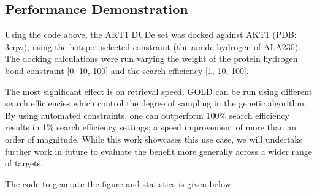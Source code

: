 \documentclass[letterpaper,10pt,english]{sphinxmanual}
\begin{document}
\begin{sphinxVerbatim}[commandchars=\\\{\}]
 

      
       
      
      
      

\end{sphinxVerbatim}


\subsection{Performance Demonstration}
\label{\detokenize{tutorial:performance-demonstration}}
Using the code above, the AKT1 DUD\sphinxhyphen{}e set was docked against AKT1 (PDB: 3cqw), using the hotspot selected constraint
(the amide hydrogen of ALA230). The docking calculations were run varying the weight of the protein hydrogen bond
constraint {[}0, 10, 100{]} and the search efficiency {[}1, 10, 100{]}.

The most significant effect is on retrieval speed. GOLD can be run using different search efficiencies which control
the degree of sampling in the genetic algorithm.  By using automated constraints, one can outperform 100\%
search efficiency results in 1\% search efficiency settings; a speed improvement of more than an order of magnitude.
While this work showcases this use case, we will undertake further work in future to evaluate the benefit
more generally across a wider range of targets.

The code to generate the figure and statistics is given below.

\noindent{}
\end{document}
